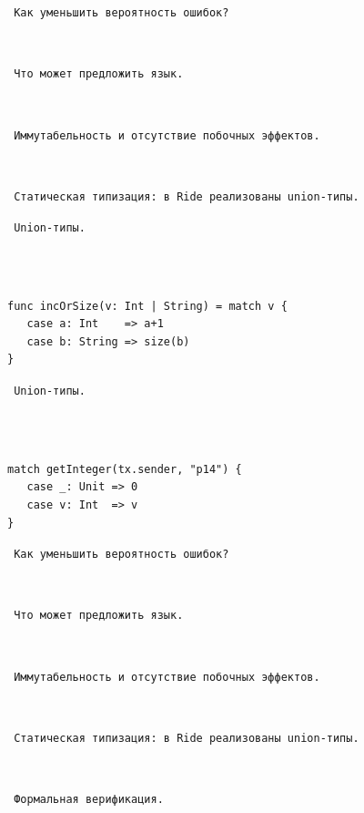 \documentclass[11pt,handout,pdf,hyperref={unicode}]{beamer}
\begin{document}
\begin{frame}[fragile]

\texttt{ Как уменьшить вероятность ошибок? }

\texttt{ }

\texttt{ Что может предложить язык. }

\texttt{ }

\texttt{ Иммутабельность и отсутствие побочных эффектов. }

\texttt{ }

\texttt{ Статическая типизация: в Ride реализованы union-типы. }

\end{frame}

\begin{frame}[fragile]

\texttt{ Union-типы. }

\texttt{ }

\begin{verbatim}

func incOrSize(v: Int | String) = match v {
   case a: Int    => a+1
   case b: String => size(b)
}

\end{verbatim}

\end{frame}

\begin{frame}[fragile]

\texttt{ Union-типы. }

\texttt{ }

\begin{verbatim}

match getInteger(tx.sender, "p14") {
   case _: Unit => 0
   case v: Int  => v
}

\end{verbatim}

\end{frame}

\begin{frame}[fragile]

\texttt{ Как уменьшить вероятность ошибок? }

\texttt{ }

\texttt{ Что может предложить язык. }

\texttt{ }

\texttt{ Иммутабельность и отсутствие побочных эффектов. }

\texttt{ }

\texttt{ Статическая типизация: в Ride реализованы union-типы. }

\texttt{ }

\texttt{ Формальная верификация. }

\end{frame}
\end{document}
